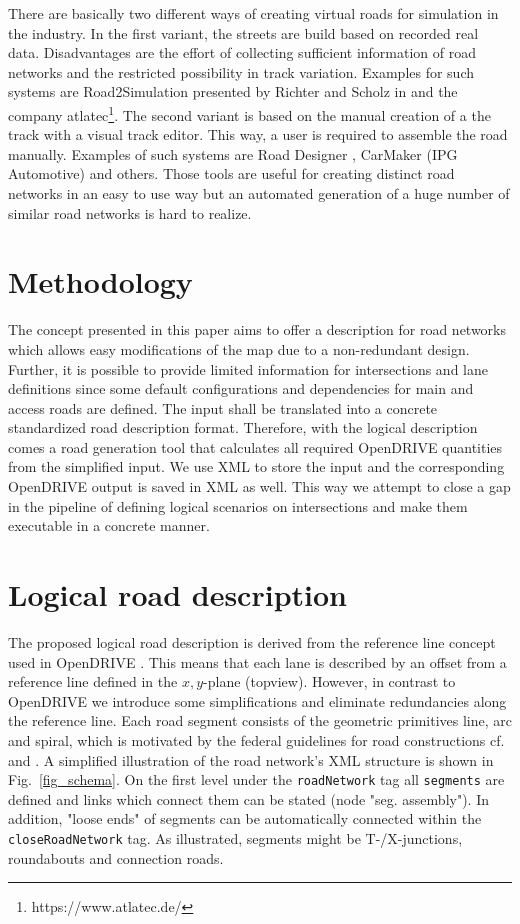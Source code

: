 \documentclass[a4paper, 10pt, conference]{ieeeconf}      %
\begin{document}
There are basically two different ways of creating virtual roads for simulation in the industry. In the first variant, the streets are build based on recorded real data. Disadvantages are the effort of collecting sufficient information of road networks and the restricted possibility in track variation. Examples for such systems are Road2Simulation presented by Richter and Scholz in \cite{dlr110094} and the company atlatec\footnote{https://www.atlatec.de/}.
The second variant is based on the manual creation of a the track with a visual track editor. This way, a user is required to assemble the road manually. Examples of such systems are Road Designer \cite{ROD}, CarMaker (IPG Automotive) and others. Those tools are useful for creating distinct road networks in an easy to use way but an automated generation of a huge number of similar road networks is hard to realize.

\section{Methodology}
The concept presented in this paper aims to offer a description for road networks which allows easy modifications of the map due to a non-redundant design. Further, it is possible to provide limited information for intersections and lane definitions since some default configurations and dependencies for main and access roads are defined. The input shall be translated into a concrete standardized road description format. Therefore, with the logical description comes a road generation tool that calculates all required OpenDRIVE quantities from the simplified input. We use XML to store the input and the corresponding OpenDRIVE output is saved in XML as well. This way we attempt to close a gap in the pipeline of defining logical scenarios on intersections and make them executable in a concrete manner.

\section{Logical road description}
The proposed logical road description is derived from the reference line concept used in OpenDRIVE \cite{odr1.5}. This means that each lane is described by an offset from a reference line defined in the $x,y$-plane (topview). However, in contrast to OpenDRIVE we introduce some simplifications and eliminate redundancies along the reference line. Each road segment consists of the geometric primitives line, arc and spiral, which is motivated by the federal guidelines for road constructions cf. \cite{Baier.2008} and \cite{StraenNRW.2019}. A simplified illustration of the road network's XML structure is shown in Fig.~\ref{fig_schema}. On the first level under the \texttt{roadNetwork} tag all \texttt{segments} are defined and links which connect them can be stated (node "seg. assembly"). In addition, "loose ends" of segments can be automatically connected within the \texttt{closeRoadNetwork} tag. As illustrated, segments might be T-/X-junctions, roundabouts and connection roads. 
\end{document}
